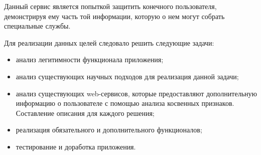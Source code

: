  Данный сервис является попыткой защитить конечного пользователя, демонстрируя ему часть той информации, которую о нем могут собрать специальные службы.


Для реализации данных целей следовало решить следующие задачи: %
	\begin{itemize}
\item анализ легитимности функционала приложения;
\item анализ существующих научных подходов для реализация данной задачи;
\item анализ существующих web-сервисов, которые предоставляют дополнительную информацию о пользователе с помощью анализа косвенных признаков. Составление описания для каждого решения;
\item реализация обязательного и дополнительного функционалов;
\item тестирование и доработка приложения.
	\end{itemize}

